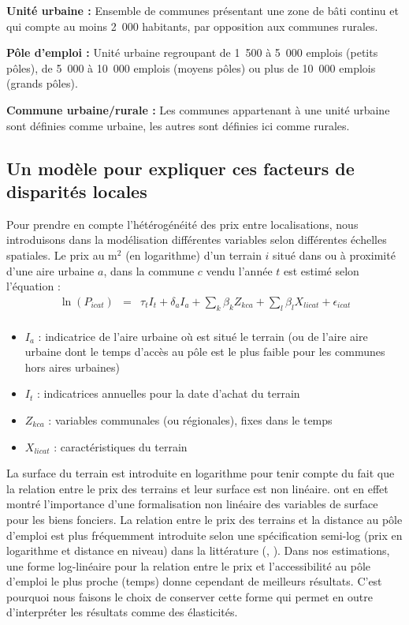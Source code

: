 \documentclass[10.5pt,a4paper]{article}
\begin{document}
{{\textbf{Unité urbaine :} Ensemble de communes présentant une zone de bâti continu et qui compte au moins 2~000 habitants, par opposition aux communes rurales. \par  

\noindent \textbf{Pôle d'emploi :} Unité urbaine regroupant de 1~500 à 5~000 emplois (petits pôles), de 5~000 à 10~000 emplois (moyens pôles) ou plus de 10~000 emplois (grands pôles). \par    

\noindent \textbf{Commune urbaine/rurale :} Les communes appartenant à une unité urbaine sont définies comme urbaine, les autres sont définies ici comme rurales. \par   
}

\subsection{Un modèle pour expliquer ces facteurs de disparités locales}

Pour prendre en compte l'hétérogénéité des prix entre localisations, nous introduisons dans la modélisation différentes variables selon différentes échelles spatiales.  Le prix au m$^2$ (en logarithme) d'un terrain $i$ situé dans ou à proximité d'une aire urbaine $a$, dans la commune $c$ vendu l'année $t$ est estimé selon l'équation :   
\begin{eqnarray}
\ln(P_{icat}) & =&  \tau_{t} I_t + \delta_{a} I_a + \sum_k \beta_k Z_{kca} + \sum_l \beta_l X_{licat}  + \epsilon_{icat} \\
\label{eq:mod_general}
\end{eqnarray}

\begin{itemize}[font=\tiny]
	\item $I_a$ : indicatrice de l'aire urbaine où est situé le terrain (ou de l'aire aire urbaine dont le temps d'accès au pôle est le plus faible pour les communes hors aires urbaines) 
	\item $I_t$ : indicatrices annuelles pour la date d'achat du terrain
	\item $Z_{kca}$ : variables communales (ou régionales), fixes dans le temps 
	\item $X_{licat}$ : caractéristiques du terrain
\end{itemize}

La surface du terrain est introduite en logarithme pour tenir compte du fait que la relation entre le prix des terrains et leur surface est non linéaire. \cite{Colwell97} ont en effet montré l’importance d’une formalisation non linéaire des variables de surface pour les biens fonciers. La relation entre le prix des terrains et la distance au pôle d'emploi est plus fréquemment introduite selon une spécification semi-log (prix en logarithme et distance en niveau) dans la littérature (\cite{Cava03}, \cite{Goffette09}). Dans nos estimations, une forme log-linéaire pour la relation entre le prix et l'accessibilité au pôle d'emploi le plus proche (temps) donne cependant de meilleurs résultats. C'est pourquoi nous faisons le choix de conserver cette forme qui permet en outre d'interpréter les résultats comme des élasticités. \par  

}
\end{document}
